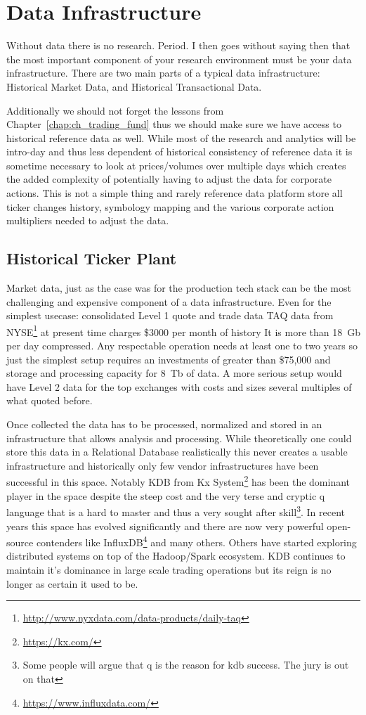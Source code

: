 \section{Data Infrastructure}

Without data there is no research. Period. I then goes without saying then that the most important component of your research environment must be your data infrastructure. There are two main parts of a typical data infrastructure: Historical Market Data, and Historical Transactional Data. 


Additionally we  should not forget the lessons from Chapter~\ref{chap:ch_trading_fund} thus we should make sure we have access to historical reference data as well. While most of the research and analytics will be intro-day and thus less dependent of historical consistency of reference data it is sometime necessary to look at prices/volumes over multiple days which creates the added complexity of potentially having to adjust the data for corporate actions. This is not a simple thing and rarely reference data platform store all ticker changes history, symbology mapping and the various corporate action multipliers needed to adjust the data.



\subsection{Historical Ticker Plant}

Market data, just as the case was for the production tech stack can be the most challenging and expensive component of a data infrastructure. Even for  the simplest usecase: consolidated Level 1 quote and trade data TAQ data from NYSE\footnote{\url{http://www.nyxdata.com/data-products/daily-taq}} at present time charges \$3000 per month of history It is more than 18~Gb per day compressed. Any respectable operation needs at least one to two years so just the simplest setup requires an investments of greater than \$75,000 and storage and processing capacity for 8~Tb of data. A more serious setup would have Level 2 data for the top exchanges with costs and sizes several multiples  of what quoted before. 


Once collected the data has to be processed, normalized and stored in an infrastructure that allows analysis and processing. While theoretically one could store this data in a Relational Database realistically this never creates a usable infrastructure and historically only few vendor infrastructures have been successful in this space. Notably KDB from Kx System\footnote{\url{https://kx.com/}} has been the dominant player in the space despite the steep cost and the very terse and cryptic q language that is a hard to master and thus a very sought after skill\footnote{Some people will argue that q is the reason for kdb success. The jury is out on that}. In recent years this space has evolved significantly and there are now very powerful open-source contenders like InfluxDB\footnote{\url{https://www.influxdata.com/}} and many others. Others have started exploring distributed systems on top of the Hadoop/Spark ecosystem. KDB continues to maintain it's dominance in large scale trading operations but its reign is no longer as certain it used to be.

